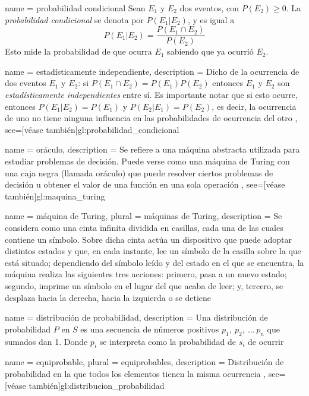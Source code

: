 {
  name = probabilidad condicional
}
{%
  Sean $ E_1 $ y $ E_2 $ dos eventos, con $ P(E_2) \ge 0 $. La
  \textit{probabilidad condicional} se denota por $ P(E_1 | E_2) $, y es
  igual a
  $$ P(E_1 | E_2) = \frac{P(E_1 \cap E_2)}{P(E_2)} $$
  Esto mide la probabilidad de que ocurra $ E_1 $ sabiendo que ya ocurrió
  $ E_2 $.
}

{
  name = estadísticamente independiente,
  description = {
    Dicho de la ocurrencia de dos eventos $ E_1 $ y $ E_2 $: si
    $ P(E_1 \cap E_2) = P(E_1) P(E_2) $ entonces $ E_1 $ y $ E_2 $ son
    \textit{estadísticamente independientes} entre sí. Es importante notar
    que si esto ocurre, entonces $ P(E_1 | E_2) = P(E_1) $ y
    $ P(E_2 | E_1) = P(E_2) $, es decir, la ocurrencia de uno no tiene ninguna
    influencia en las probabilidades de ocurrencia del otro%
  },
  see=[véase también]{gl:probabilidad_condicional}
}

{
  name = oráculo,
  description = {
    Se refiere a una máquina abstracta utilizada para estudiar problemas de
    decisión. Puede verse como una máquina de Turing con una caja negra
    (llamada oráculo) que puede resolver ciertos problemas de decisión u
    obtener el valor de una función en una sola operación%
  },
  see=[véase también]{gl:maquina_turing}
}

{
  name = máquina de Turing,
  plural = máquinas de Turing,
  description = {
    Se considera como una cinta infinita dividida en casillas, cada una de las
    cuales contiene un símbolo. Sobre dicha cinta actúa un dispositivo que
    puede adoptar distintos estados y que, en cada instante, lee un símbolo de
    la casilla sobre la que está situado; dependiendo del símbolo leído y del
    estado en el que se encuentra, la máquina realiza las siguientes tres
    acciones: primero, pasa a un nuevo estado; segundo, imprime un símbolo en
    el lugar del que acaba de leer; y, tercero, se desplaza hacia la derecha,
    hacia la izquierda o se detiene%
  }
}

{
  name = distribución de probabilidad,
  description = {
    Una distribución de probabilidad $P$ en $S$ es una secuencia de números
    positivos $p_1,\: p_2,\: \dots\, p_n$ que sumados dan 1. Donde $p_i$ se
    interpreta como la probabilidad de $s_i$ de ocurrir%
  }
}

{
  name = equiprobable,
  plural = equiprobables,
  description = {
    Distribución de probabilidad en la que todos los elementos tienen la misma
    ocurrencia%
  },
  see=[véase también]{gl:distribucion_probabilidad}
}

